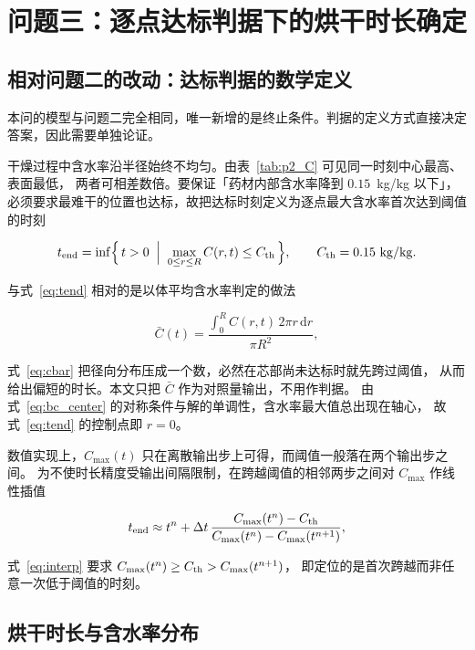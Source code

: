 \section{问题三：逐点达标判据下的烘干时长确定}

\subsection{相对问题二的改动：达标判据的数学定义}

本问的模型与问题二完全相同，唯一新增的是终止条件。判据的定义方式直接决定答案，因此需要单独论证。

干燥过程中含水率沿半径始终不均匀。由表~\ref{tab:p2_C} 可见同一时刻中心最高、表面最低，
两者可相差数倍。要保证「药材内部含水率降到 $0.15$~kg/kg 以下」，
必须要求最难干的位置也达标，故把达标时刻定义为逐点最大含水率首次达到阈值的时刻

\begin{equation}\label{eq:tend}
t_{\rm end}=\inf\Bigl\{\,t>0 \;\Bigm|\; \max_{0\le r\le R} C(r,t) \le C_{\rm th}\,\Bigr\},
\qquad C_{\rm th}=0.15~\mathrm{kg/kg}.
\end{equation}

与式~\eqref{eq:tend} 相对的是以体平均含水率判定的做法

\begin{equation}\label{eq:cbar}
\bar C(t)=\frac{\displaystyle\int_0^R C(r,t)\,2\pi r\,\mathrm{d}r}{\pi R^2},
\end{equation}

式~\eqref{eq:cbar} 把径向分布压成一个数，必然在芯部尚未达标时就先跨过阈值，
从而给出偏短的时长。本文只把 $\bar C$ 作为对照量输出，不用作判据。
由式~\eqref{eq:bc_center} 的对称条件与解的单调性，含水率最大值总出现在轴心，
故式~\eqref{eq:tend} 的控制点即 $r=0$。

数值实现上，$C_{\max}(t)$ 只在离散输出步上可得，而阈值一般落在两个输出步之间。
为不使时长精度受输出间隔限制，在跨越阈值的相邻两步之间对 $C_{\max}$ 作线性插值

\begin{equation}\label{eq:interp}
t_{\rm end}\approx t^{n}+\Delta t\,
\frac{C_{\max}(t^{n})-C_{\rm th}}{C_{\max}(t^{n})-C_{\max}(t^{n+1})},
\end{equation}

式~\eqref{eq:interp} 要求 $C_{\max}(t^n)\ge C_{\rm th}>C_{\max}(t^{n+1})$，
即定位的是首次跨越而非任意一次低于阈值的时刻。

\subsection{烘干时长与含水率分布}

